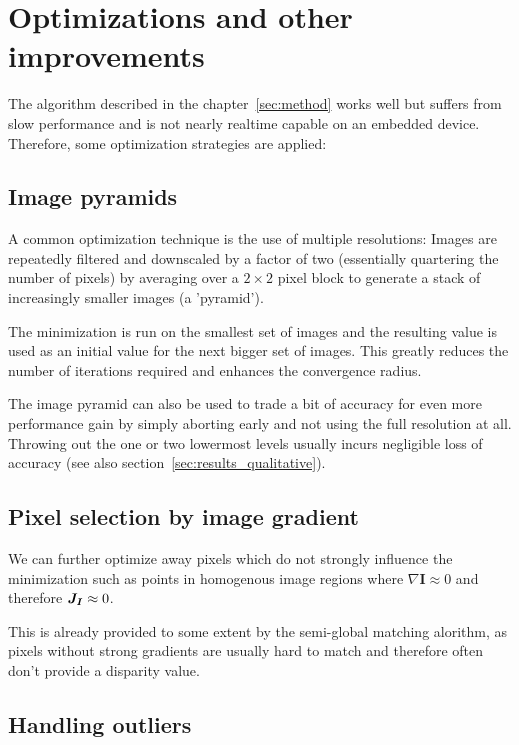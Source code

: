 \chapter{Optimizations and other improvements}
\label{sec:optimizations}

The algorithm described in the chapter~\ref{sec:method} works well but suffers from
slow performance and is not nearly realtime capable on an embedded device.
Therefore, some optimization strategies are applied:

\section{Image pyramids}
\label{sec:pyramids}

A common optimization technique is the use of multiple resolutions: Images are
repeatedly filtered and downscaled by a factor of two (essentially quartering
the number of pixels) by averaging over a $2 \times 2$ pixel block to generate
a stack of increasingly smaller images (a 'pyramid').

The minimization is run on the smallest set of images and the resulting value
is used as an initial value for the next bigger set of images.
This greatly reduces the number of iterations required and enhances the
convergence radius.

The image pyramid can also be used to trade a bit of accuracy for even more
performance gain by simply aborting early and not using the full resolution at
all. Throwing out the one or two lowermost levels usually incurs negligible
loss of accuracy (see also section~\ref{sec:results_qualitative}).


\section{Pixel selection by image gradient}
\label{sec:gradient_filtering}

We can further optimize away pixels which do not strongly influence the
minimization such as points in homogenous image regions where $\nabla
\mathbf{I} \approx 0$ and therefore $\mat{J_I} \approx 0$.

This is already provided to some extent by the semi-global matching alorithm,
as pixels without strong gradients are usually hard to match and therefore often
don't provide a disparity value.

\section{Handling outliers}

